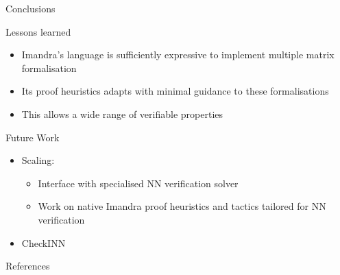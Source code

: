 \documentclass[handout]{beamer}
\begin{document}
\begin{frame}{Conclusions}
	\begin{block}{Lessons learned}
		\begin{itemize}
			\item<1-> Imandra's language is sufficiently expressive to implement multiple matrix formalisation
			\item<2-> Its proof heuristics adapts with minimal guidance to these formalisations
			\item<3-> This allows a wide range of verifiable properties
		\end{itemize}
	\end{block}
\end{frame}

\begin{frame}{Future Work}
	\begin{itemize}
	\item Scaling: 
		\begin{itemize}
			\item<1-> Interface with specialised NN verification solver
			\item<2-> Work on native Imandra proof heuristics and tactics tailored for NN verification
		\end{itemize}
	\item<4-> CheckINN
	\end{itemize}
\end{frame}

\begin{frame}[shrink=40]{References}
\printbibliography
\end{frame}
\end{document}
